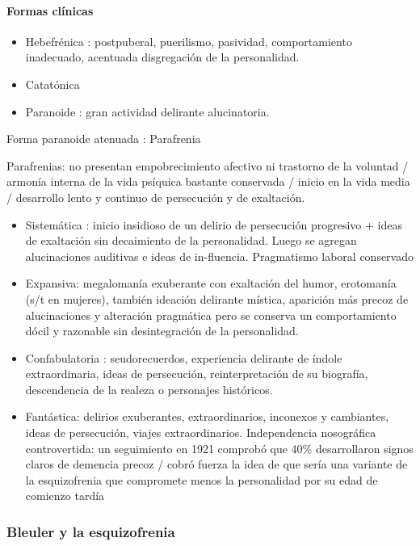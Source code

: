 \paragraph*{Formas clínicas}
\begin{itemize}
    \item Hebefrénica : postpuberal, puerilismo, pasividad, comportamiento inadecuado, acentuada disgregación de la personalidad.
    \item Catatónica
    \item Paranoide : gran actividad delirante alucinatoria.
\end{itemize}
Forma paranoide atenuada : Parafrenia

Parafrenias: no presentan empobrecimiento afectivo ni trastorno de la voluntad / armonía interna de la vida psíquica bastante conservada / inicio en la vida media / desarrollo lento y continuo de persecución y de exaltación.

\begin{itemize}
    \item Sistemática : inicio insidioso de un delirio de persecución progresivo + ideas de exaltación sin decaimiento de la personalidad. Luego se agregan alucinaciones auditivas e ideas de in-fluencia. Pragmatismo laboral conservado
    \item Expansiva: megalomanía exuberante con exaltación del humor, erotomanía (s/t en mujeres), también ideación delirante mística, aparición más precoz de alucinaciones y alteración pragmática pero se conserva un comportamiento dócil y razonable sin desintegración de la personalidad.
    \item Confabulatoria : seudorecuerdos, experiencia delirante de índole extraordinaria, ideas de persecución, reinterpretación de su biografía, descendencia de la realeza o personajes históricos.
    \item Fantástica: delirios exuberantes, extraordinarios, inconexos y cambiantes, ideas de persecución, viajes extraordinarios. Independencia nosográfica controvertida: un seguimiento en 1921 comprobó que 40\% desarrollaron signos claros de demencia precoz / cobró fuerza la idea de que sería una variante de la esquizofrenia que compromete menos la personalidad por su edad de comienzo tardía
\end{itemize}

\subsubsection*{Bleuler y la esquizofrenia}

